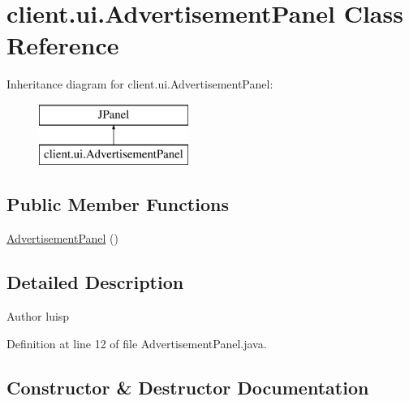 \hypertarget{classclient_1_1ui_1_1_advertisement_panel}{}\section{client.\+ui.\+Advertisement\+Panel Class Reference}
\label{classclient_1_1ui_1_1_advertisement_panel}
Inheritance diagram for client.\+ui.\+Advertisement\+Panel\+:\begin{figure}[H]
\begin{center}
\leavevmode
\includegraphics[height=2.000000cm]{classclient_1_1ui_1_1_advertisement_panel}
\end{center}
\end{figure}
\subsection*{Public Member Functions}
\begin{DoxyCompactItemize}
\item 
\hyperlink{classclient_1_1ui_1_1_advertisement_panel_a171949b3f26ea771832fa714c352b9e6}{Advertisement\+Panel} ()
\end{DoxyCompactItemize}


\subsection{Detailed Description}
\begin{DoxyAuthor}{Author}
luisp 
\end{DoxyAuthor}


Definition at line 12 of file Advertisement\+Panel.\+java.



\subsection{Constructor \& Destructor Documentation}
\hypertarget{classclient_1_1ui_1_1_advertisement_panel_a171949b3f26ea771832fa714c352b9e6}{}\label{classclient_1_1ui_1_1_advertisement_panel_a171949b3f26ea771832fa714c352b9e6} 

